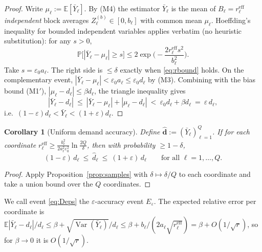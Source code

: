 \documentclass{amsart}
\newtheorem{corollary}{Corollary}
\theoremstyle{definition}
\newcommand{\E}{\mathbb{E}}
\renewcommand{\Pr}{\mathbb{P}}
\begin{document}
\begin{proof}
Write $\mu_\ell:=\E[\bar Y_\ell]$. By (M4) the estimator $\bar Y_\ell$ is the
mean of $B_\ell=r_\ell^{\mathrm{eff}}$ \emph{independent} block averages
$Z^{(b)}_\ell\in[0,b_\ell]$ with common mean $\mu_\ell$. Hoeffding's inequality
for bounded independent variables applies verbatim (no heuristic substitution):
for any $s>0$,
\[
\Pr\big[|\bar Y_\ell-\mu_\ell|\ge s\big]\le 2\exp\!\Big(-\frac{2 r_\ell^{\mathrm{eff}} s^2}{b_\ell^2}\Big).
\]
Take $s=\varepsilon_0 a_\ell$. The right side is $\le\delta$ exactly when
\eqref{eq:rbound} holds. On the complementary event,
$|\bar Y_\ell-\mu_\ell|<\varepsilon_0 a_\ell\le\varepsilon_0 d_\ell$ by (M3).
Combining with the bias bound (M1$'$), $|\mu_\ell-d_\ell|\le\beta d_\ell$, the
triangle inequality gives
\[
|\bar Y_\ell-d_\ell|\ \le\ |\bar Y_\ell-\mu_\ell|+|\mu_\ell-d_\ell|
\ <\ \varepsilon_0 d_\ell+\beta d_\ell\ =\ \varepsilon\, d_\ell,
\]
i.e.\ $(1-\varepsilon)d_\ell<\bar Y_\ell<(1+\varepsilon)d_\ell$.
\end{proof}

\begin{corollary}[Uniform demand accuracy]\label{cor:uniform}
Define $\widehat{\mathbf d}:=(\bar Y_\ell)_{\ell=1}^Q$. If for each coordinate
$r_\ell^{\mathrm{eff}}\ge\frac{b_\ell^2}{2a_\ell^2\varepsilon_0^2}\ln\frac{2Q}{\delta}$,
then with probability $\ge1-\delta$,
\begin{equation}\label{eq:Deps}
(1-\varepsilon)\,d_\ell\ \le\ \widehat d_\ell\ \le\ (1+\varepsilon)\,d_\ell
\qquad\text{for all }\ell=1,\dots,Q.
\end{equation}
\end{corollary}

\begin{proof}
Apply Proposition~\ref{prop:samples} with $\delta\mapsto\delta/Q$ to each
coordinate and take a union bound over the $Q$ coordinates.
\end{proof}

We call event \eqref{eq:Deps} the $\varepsilon$-accuracy event $E_\varepsilon$.
The expected relative error per coordinate is
$\E|\bar Y_\ell-d_\ell|/d_\ell\le\beta+\sqrt{\operatorname{Var}(\bar Y_\ell)}/d_\ell
\le\beta+b_\ell/(2a_\ell\sqrt{r_\ell^{\mathrm{eff}}})=\beta+O(1/\sqrt r)$,
so for $\beta\to0$ it is $O(1/\sqrt r)$.
\end{document}
